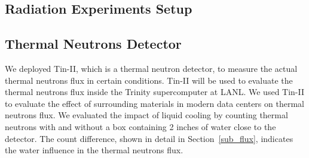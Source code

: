 \subsection{Radiation Experiments Setup}
\label{sub_beam_setup}



\subsection{Thermal Neutrons Detector}
\label{sub_detector}

We deployed Tin-II, which is a thermal neutron detector,  to measure the actual thermal neutrons flux in certain conditions. Tin-II will be used to evaluate the thermal neutrons flux inside the Trinity supercomputer at LANL.  We used Tin-II to evaluate the effect of surrounding materials in modern data centers on thermal neutrons flux. We evaluated the impact of liquid cooling by counting thermal neutrons with and without a box containing 2 inches of water close to the detector. The count difference, shown in detail in Section~\ref{sub_flux}, indicates the water influence in the thermal neutrons flux.

